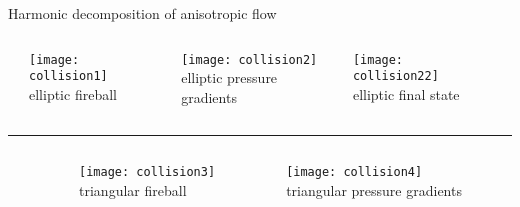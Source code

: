 \documentclass[svgnames]{beamer}
\begin{document}
\begin{frame}[t,noframenumbering]{Harmonic decomposition of anisotropic flow}
\vspace{0.1 in}
\begin{columns}
 \begin{column}{0.05\textwidth}
 \end{column}

 \begin{column}{0.3\textwidth}
  \centering
  \texttt{[image: collision1]} \\
  \footnotesize elliptic fireball
 \end{column}
 
 \begin{column}{0.3\textwidth}
 \centering
  \hspace{0.15 in}
  \texttt{[image: collision2]} \\
  \footnotesize elliptic pressure gradients
 \end{column}
 
 \begin{column}{0.3\textwidth}
  \centering
  \texttt{[image: collision22]} \\
  \footnotesize elliptic final state
 \end{column}
 
 \begin{column}{0.05\textwidth}
 \end{column}
\end{columns}

\vspace{0.2 in}
\hrule
\vspace{0.2 in}

\begin{columns}
 \begin{column}{0.05\textwidth}
 \end{column}

 \begin{column}{0.3\textwidth}
  \centering
  \texttt{[image: collision3]} \\
  \footnotesize triangular fireball
 \end{column}
 
 \begin{column}{0.3\textwidth}
 \centering
  \hspace{0.15 in}
  \texttt{[image: collision4]} \\
  \footnotesize triangular pressure gradients
 \end{column}
 

\end{columns}
\end{frame}
\end{document}

